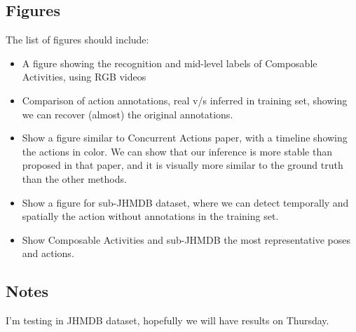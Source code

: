 \subsection{Figures}
The list of figures should include:
\begin{itemize}
\item A figure showing the recognition and mid-level labels of Composable Activities, using RGB videos
\item Comparison of action annotations, real v/s inferred in training set, showing we can recover (almost) the original annotations.
\item Show a figure similar to Concurrent Actions paper, with a timeline showing the actions in color. We can show that our inference is more stable than proposed in that paper, and it is visually more similar to the ground truth than the other methods.
\item Show a figure for sub-JHMDB dataset, where we can detect temporally and spatially the action without annotations in the training set.
\item Show Composable Activities and sub-JHMDB  the most representative poses and actions.
\end{itemize}

\subsection{Notes}
I'm testing in JHMDB dataset, hopefully we will have results on Thursday.

